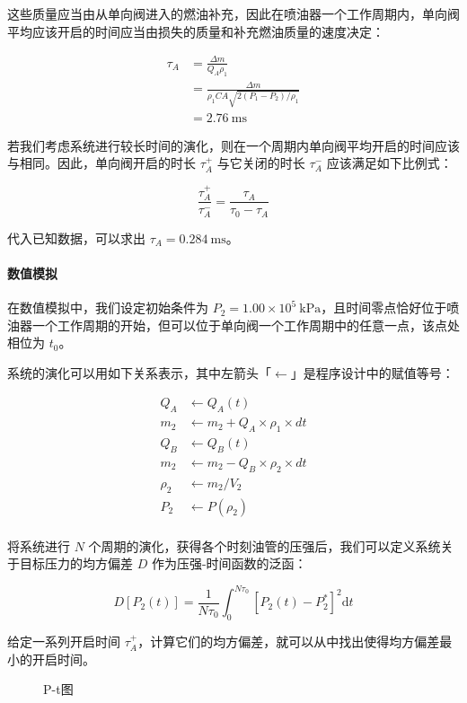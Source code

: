 \documentclass{cumcmthesis}
\begin{document}
这些质量应当由从单向阀进入的燃油补充，因此在喷油器一个工作周期内，单向阀平均应该开启的时间应当由损失的质量和补充燃油质量的速度决定：

$$
\begin{aligned}
\tau_A&=\frac{\Delta m}{Q_A\rho_1}\\
&=\frac{\Delta m}{\rho_1CA\sqrt{2(P_1-P_2)/\rho_1}}\\
&=2.76~\mathrm{ms}
\end{aligned}
$$

若我们考虑系统进行较长时间的演化，则在一个周期内单向阀平均开启的时间应该与相同。因此，单向阀开启的时长 $\tau_A^+$ 与它关闭的时长 $\tau_A^-$ 应该满足如下比例式：

$$
\frac{\tau_A^+}{\tau_A^-}=\frac{\tau_A}{\tau_0-\tau_A}
$$

代入已知数据，可以求出 $\tau_A=0.284~\mathrm{ms}$。

\paragraph{数值模拟}

在数值模拟中，我们设定初始条件为 $P_2=1.00\times 10^5~{\mathrm{kPa}}$，且时间零点恰好位于喷油器一个工作周期的开始，但可以位于单向阀一个工作周期中的任意一点，该点处相位为 $t_0$。

系统的演化可以用如下关系表示，其中左箭头「$\leftarrow$」是程序设计中的赋值等号：

$$
\begin{aligned}
Q_A &\leftarrow Q_A(t)\\
m_2 &\leftarrow m_2 + Q_A \times \rho_1 \times dt\\
Q_B &\leftarrow Q_B(t)\\
m_2 &\leftarrow m_2 - Q_B \times \rho_2 \times dt\\
\rho_2 &\leftarrow m_2 / V_2\\
P_2 &\leftarrow P(\rho_2)\\
\end{aligned}
$$

将系统进行 $N$ 个周期的演化，获得各个时刻油管的压强后，我们可以定义系统关于目标压力的均方偏差 $D$ 作为压强-时间函数的泛函：

$$
D[P_2(t)]=\frac1{N\tau_0}\int_0^{N\tau_0}
\left[P_2(t)-P_2^*\right]^2\mathrm dt
$$

给定一系列开启时间 $\tau_A^+$，计算它们的均方偏差，就可以从中找出使得均方偏差最小的开启时间。



\begin{center}
\begin{figure}[h!]
\caption{P-t图}
\end{figure}

\end{center}
\end{document}
